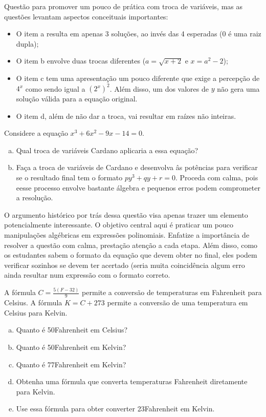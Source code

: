 \documentclass[main_estudante.tex]{subfiles}
\begin{document}
Questão para promover um pouco de prática com troca de variáveis, mas as questões levantam aspectos conceituais importantes:
\begin{itemize}
 \item O item a resulta em apenas 3 soluções, ao invés das 4 esperadas ($0$ é uma raiz dupla);
 \item O item b envolve duas trocas diferentes ($a=\sqrt{x+2}$ e $x=a^2-2$);
 \item O item c tem uma apresentação um pouco diferente que exige a percepção de $4^x$ como sendo igual a $(2^x)^2$. Além disso, um dos valores de $y$ não gera uma solução válida para a equação original.
 \item O item d, além de não dar a troca, vai resultar em raízes não inteiras.
\end{itemize}

\begin{questao}
Considere a equação $x^3+6x^2-9x-14=0$.
\begin{enumerate}[a)]
\item Qual troca de variáveis Cardano aplicaria a essa equação?
\item Faça a troca de variáveis de Cardano e desenvolva âs potências para verificar se o resultado final tem o formato $py^3+qy+r=0$. Proceda com calma, pois eesse processo envolve bastante álgebra e pequenos erros podem comprometer a resolução.
\end{enumerate}
\end{questao}

O argumento histórico por trás dessa questão visa apenas trazer um elemento potencialmente interessante. O objetivo central aqui é praticar um pouco manipulações algébricas em expressões polinomiais. Enfatize a importância de resolver a questão com calma, prestação atenção a cada etapa. Além disso, como os estudantes sabem o formato da equação que devem obter no final, eles podem verificar sozinhos se devem ter acertado (seria muita coincidência algum erro ainda resultar num expressão com o formato correto.

\begin{questao}
A fórmula $C=\frac{5(F-32)}{9}$ permite a conversão de temperaturas em Fahrenheit para Celsius. A fórmula $K=C+273$ permite a conversão de uma temperatura em Celsius para Kelvin.
\begin{enumerate}[a)]
\item Quanto é 50\degree Fahrenheit em Celsius?
\item Quanto é 50\degree Fahrenheit em Kelvin?
\item Quanto é 77\degree Fahrenheit em Kelvin?
\item Obtenha uma fórmula que converta temperaturas Fahrenheit diretamente para Kelvin.
\item Use essa fórmula para obter converter 23\degree Fahrenheit em Kelvin.
\end{enumerate}
\end{questao}
\end{document}
